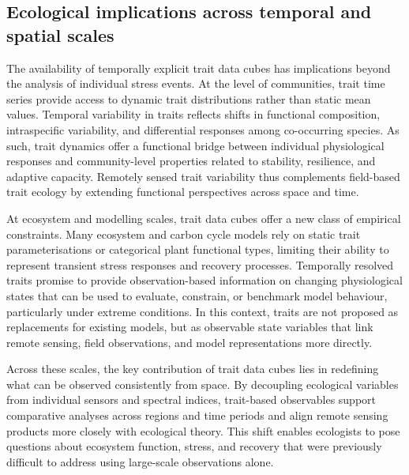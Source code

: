 \documentclass[pdflatex,sn-mathphys-num]{sn-jnl}%
\theoremstyle{thmstyleone}%
\theoremstyle{thmstyletwo}%
\theoremstyle{thmstylethree}%
\begin{document}
\subsection{Ecological implications across temporal and spatial scales}

The availability of temporally explicit trait data cubes has implications beyond the analysis of individual stress events. At the level of communities, trait time series provide access to dynamic trait distributions rather than static mean values. Temporal variability in traits reflects shifts in functional composition, intraspecific variability, and differential responses among co-occurring species. As such, trait dynamics offer a functional bridge between individual physiological responses and community-level properties related to stability, resilience, and adaptive capacity. Remotely sensed trait variability thus complements field-based trait ecology by extending functional perspectives across space and time.

At ecosystem and modelling scales, trait data cubes offer a new class of empirical constraints. Many ecosystem and carbon cycle models rely on static trait parameterisations or categorical plant functional types, limiting their ability to represent transient stress responses and recovery processes. Temporally resolved traits promise to provide observation-based information on changing physiological states that can be used to evaluate, constrain, or benchmark model behaviour, particularly under extreme conditions. In this context, traits are not proposed as replacements for existing models, but as observable state variables that link remote sensing, field observations, and model representations more directly.

Across these scales, the key contribution of trait data cubes lies in redefining what can be observed consistently from space. By decoupling ecological variables from individual sensors and spectral indices, trait-based observables support comparative analyses across regions and time periods and align remote sensing products more closely with ecological theory. This shift enables ecologists to pose questions about ecosystem function, stress, and recovery that were previously difficult to address using large-scale observations alone.




\end{document}

